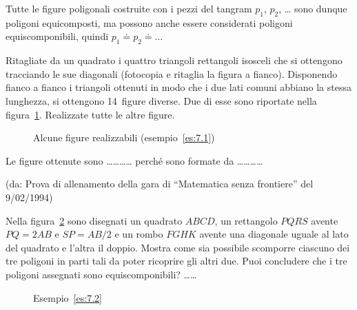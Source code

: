 Tutte le figure poligonali costruite con i pezzi del tangram $p_1$, 
$p_2$, \ldots{} sono dunque poligoni equicomposti, ma possono anche 
essere considerati poligoni equiscomponibili, quindi $p_1 \doteq p_2 
\doteq \ldots{}$

\begin{exrig}
\noindent\begin{minipage}{0.65\textwidth}\parindent15pt
\begin{esempio}\label{es:7.1}
Ritagliate da un quadrato i quattro triangoli rettangoli isosceli che 
si ottengono tracciando le sue diagonali (fotocopia e ritaglia la 
figura a fianco). Disponendo fianco a fianco i triangoli ottenuti in 
modo che i due lati comuni abbiano la stessa lunghezza, si ottengono 
14~figure diverse. Due di esse sono riportate nella 
figura~\ref{fig:quadrato2}. Realizzate tutte le altre figure.
\end{esempio}
\end{minipage}\hfil
\begin{minipage}{0.35\textwidth}
	\centering
\end{minipage}\vspace{5pt}


\begin{inaccessibleblock}
 \begin{figure}[!htb]
\centering
\caption{Alcune figure realizzabili 
(esempio~\ref{es:7.1})}\label{fig:quadrato2}
\end{figure}
\end{inaccessibleblock}

Le figure ottenute sono \ldots\ldots\ldots\ldots{} perché sono 
formate da \ldots\ldots\ldots\ldots{}

\noindent(da: Prova di allenamento della gara di ``Matematica senza 
frontiere'' del 9/02/1994)

\begin{esempio}\label{es:7.2}
Nella figura~\ref{fig:figure} sono disegnati un quadrato $ABCD$, un 
rettangolo $PQRS$ avente $PQ=2AB$ e $SP=AB/2$ e un rombo $FGHK$ 
avente una diagonale uguale al lato del quadrato e l'altra il doppio. 
Mostra come sia possibile scomporre ciascuno dei tre poligoni in parti 
tali da poter ricoprire gli altri due. Puoi concludere che i tre 
poligoni assegnati sono equiscomponibili? \ldots\ldots{}


\begin{inaccessibleblock}
 \begin{figure}[!htb]
	\centering
	\caption{Esempio~\ref{es:7.2}}\label{fig:figure}
\end{figure}
\end{inaccessibleblock}


\end{esempio}
\end{exrig}
